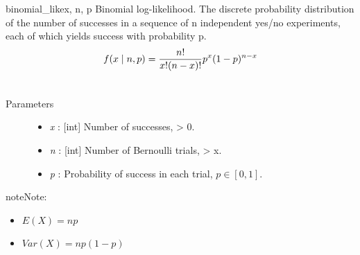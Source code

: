 \hypertarget{pymc.distributions.binomial_like}{}\begin{funcdesc}{binomial\_like}{x, n, p}
Binomial log-likelihood.  The discrete probability distribution of the
number of successes in a sequence of n independent yes/no experiments,
each of which yields success with probability p.
\begin{gather}
\begin{split}f(x \mid n, p) = \frac{n!}{x!(n-x)!} p^x (1-p)^{n-x}\end{split}\notag\\\begin{split}\end{split}\notag
\end{gather}\begin{description}
\item[Parameters] \leavevmode\begin{itemize}
\item {}
\emph{x} : {[}int{]} Number of successes, \textgreater{} 0.

\item {}
\emph{n} : {[}int{]} Number of Bernoulli trials, \textgreater{} x.

\item {}
\emph{p} : Probability of success in each trial, $p \in [0,1]$.

\end{itemize}

\end{description}

\begin{notice}{note}{Note:}\begin{itemize}
\item {}
$E(X)=np$

\item {}
$Var(X)=np(1-p)$

\end{itemize}
\end{notice}
\end{funcdesc}

